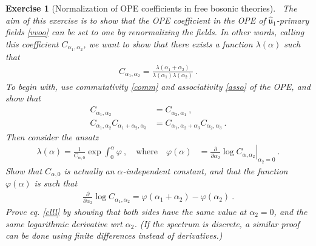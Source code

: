 \documentclass[12pt, a4paper, notitlepage, twoside]{report}
\numberwithin{equation}{section}
\theoremstyle{break}
\newtheorem{exo}{Exercise}[chapter]
\begin{document}
\begin{exo}[Normalization of OPE coefficients in free bosonic theories]
 ~\label{exoone}
The aim of this exercise is to show that the OPE coefficient in the OPE of $\hat{\mathfrak{u}}_1$-primary fields \eqref{vvoo} can be set to one by renormalizing the fields.
In other words, calling this coefficient $C_{\alpha_1,\alpha_2}$, we want to show that there exists a function $\lambda(\alpha)$ such that 
\begin{align}
 C_{\alpha_1,\alpha_2} = \frac{\lambda(\alpha_1+\alpha_2)}{\lambda(\alpha_1)\lambda(\alpha_2)}\ .
\label{clll}
\end{align}
To begin with, 
use commutativity \eqref{comm} and associativity \eqref{asso} of the OPE, and show that 
\begin{align}
C_{\alpha_1,\alpha_2} &= C_{\alpha_2,\alpha_1}\ ,
\\
 C_{\alpha_1,\alpha_2}C_{\alpha_1+\alpha_2,\alpha_3} &= C_{\alpha_1,\alpha_2+\alpha_3}C_{\alpha_2,\alpha_3}\ .
\end{align}
Then consider the ansatz
\begin{align}
  \lambda(\alpha) = \frac{1}{C_{\alpha,0}} \exp \int_0^{\alpha} \varphi \ , \quad \text{where}\quad  
 \varphi(\alpha)&=\left.{\frac{\partial}{\partial \alpha_2}}\log C_{\alpha,\alpha_2}\right|_{\alpha_2=0}\ .
\end{align}
Show that $C_{\alpha,0}$ is actually an $\alpha$-independent constant, and that the function $\varphi(\alpha)$ is such that
\begin{align}
 {\frac{\partial}{\partial \alpha_2}} \log C_{\alpha_1,\alpha_2}  = \varphi(\alpha_1+\alpha_2)-\varphi(\alpha_2)\ . 
\end{align}
Prove eq. \eqref{clll} by showing that both sides have the same value at $\alpha_2=0$, and the same logarithmic derivative wrt $\alpha_2$. 
(If the spectrum is discrete, a similar proof can be done using finite differences instead of derivatives.) 
\end{exo}
\end{document}
